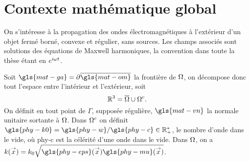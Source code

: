 


%     




\chapter{Contexte mathématique global}

\label{sec:context_math}
\minitoc
\newpage

On s’intéresse à la propagation des ondes électromagnétiques à l'extérieur d'un objet fermé borné, convexe et régulier, sans sources. 
Les champs associés sont solutions des équations de Maxwell harmoniques, la convention dans toute la thèse étant en \(e^{i\omega t}\). 

Soit \(\gls{mat-ga}=\partial\overline{\gls{mat-om}}\) la frontière de \(\Omega\), on décompose donc tout l'espace entre l'intérieur et l'extérieur, soit 
\[
\mathbb R^3 = \overline{\Omega}\cup{\Omega}^c.
\]
On définit en tout point de \(\Gamma\), supposée régulière, \(\gls{mat-vn}\) la normale unitaire sortante à \(\Omega\).
Dans \(\Omega^c\) on définit \(\gls{phy-k0}=\gls{phy-w} / \gls{phy-c} \in \RR_+^*\), le nombre d'onde dans le vide, où \gls{phy-c} 
est la célérité d'une onde dans le vide.
Dans \(\Omega\), on a \(k(\vx)=k_0\sqrt{\gls{phy-eps}(\vx)\gls{phy-mu}(\vx)}\).

